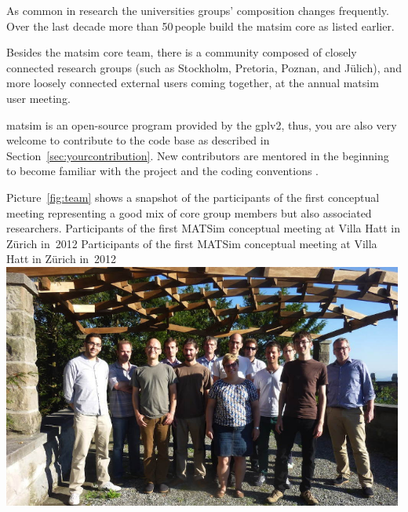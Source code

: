 As common in research the universities groups' composition changes frequently. Over the last decade more than 50\,people build the \gls{matsim} core as listed earlier.

Besides the \gls{matsim} core team, there is a community composed of closely connected research groups (such as Stockholm, Pretoria, Poznan, and Jülich),
and more loosely connected external users coming together, \eg at the annual \gls{matsim} user meeting.   

\gls{matsim} is an open-source program provided by the \gls{gplv2}, thus, you are also very welcome to contribute to the code base as described in Section~\ref{sec:yourcontribution}. New contributors are mentored in the beginning \citep[][]{MATSIM-BecomingAContributor_Webpage_2015} to become familiar with the project and the coding conventions \citep[][]{MATSIM-CodingGuide_Webpage_2015}.

Picture~\ref{fig:team} shows a snapshot of the participants of the first conceptual meeting representing a good mix of core group members but also associated researchers.
%
\createfigure%
{Participants of the first MATSim conceptual meeting at Villa Hatt in Zürich in~2012}%
{Participants of the first MATSim conceptual meeting at Villa Hatt in Zürich in~2012}%
{\label{fig:team}}%
{\includegraphics[width=0.99\textwidth, angle=0]{extending/figures/ConceptualMeetingVillaHatt.png}}%
{}

